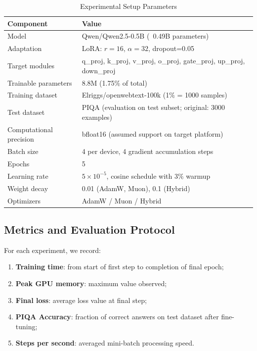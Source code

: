 \documentclass[a4paper,12pt]{article}
\begin{document}
\begin{table}[H]
\centering
\caption{Experimental Setup Parameters}
\label{tab:setup}
\begin{tabular}{ll}
\toprule
\textbf{Component} & \textbf{Value} \\
\midrule
Model & Qwen/Qwen2.5-0.5B (~0.49B parameters) \\
Adaptation & LoRA: $r=16$, $\alpha=32$, dropout=0.05 \\
Target modules & q\_proj, k\_proj, v\_proj, o\_proj, gate\_proj, up\_proj, down\_proj \\
Trainable parameters & 8.8M (1.75\% of total) \\
Training dataset & Elriggs/openwebtext-100k (1\% = 1000 samples) \\
Test dataset & PIQA (evaluation on test subset; original: 3000 examples) \\
Computational precision & bfloat16 (assumed support on target platform) \\
Batch size & 4 per device, 4 gradient accumulation steps \\
Epochs & 5 \\
Learning rate & $5 \times 10^{-5}$, cosine schedule with 3\% warmup \\
Weight decay & 0.01 (AdamW, Muon), 0.1 (Hybrid) \\
Optimizers & AdamW / Muon / Hybrid \\
\bottomrule
\end{tabular}
\end{table}

\subsection{Metrics and Evaluation Protocol}

For each experiment, we record:
\begin{enumerate}
    \item \textbf{Training time}: from start of first step to completion of final epoch;
    \item \textbf{Peak GPU memory}: maximum value observed;
    \item \textbf{Final loss}: average loss value at final step;
    \item \textbf{PIQA Accuracy}: fraction of correct answers on test dataset after fine-tuning;
    \item \textbf{Steps per second}: averaged mini-batch processing speed.
\end{enumerate}
\end{document}
